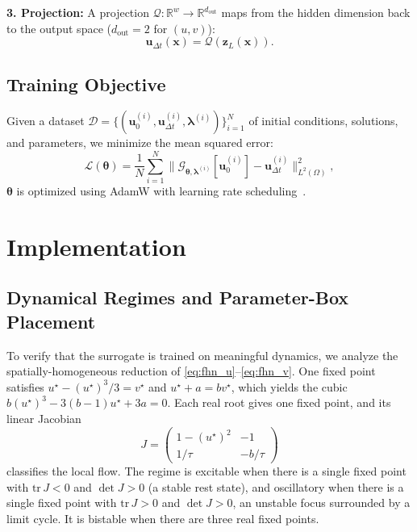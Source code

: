 \documentclass[runningheads]{llncs}
\begin{document}
\textbf{3. Projection:} A projection $\mathcal{Q}: \mathbb{R}^w \rightarrow \mathbb{R}^{d_{\text{out}}}$ maps from the hidden dimension back to the output space ($d_{\text{out}} = 2$ for $(u,v)$):
\begin{equation}
    \bm{u}_{\Delta t}(\bm{x}) = \mathcal{Q}(\bm{z}_L(\bm{x})).
\end{equation}

\subsection{Training Objective}
\label{sec:training}

Given a dataset $\mathcal{D} = \{(\bm{u}_0^{(i)}, \bm{u}_{\Delta t}^{(i)}, \bm{\lambda}^{(i)})\}_{i=1}^N$ of initial conditions, solutions, and parameters, we minimize the mean squared error:
\begin{equation}
    \mathcal{L}(\bm{\theta}) = \frac{1}{N} \sum_{i=1}^N \|\mathcal{G}_{\bm{\theta}, \bm{\lambda}^{(i)}}[\bm{u}_0^{(i)}] - \bm{u}_{\Delta t}^{(i)}\|_{L^2(\Omega)}^2,
    \label{eq:loss}
\end{equation}
$\bm{\theta}$ is optimized using AdamW with learning rate scheduling~\cite{loshchilov2019decoupled}.

\FloatBarrier
\section{Implementation}
\label{sec:implementation}

\subsection{Dynamical Regimes and Parameter-Box Placement}
\label{sec:bifurcation}

To verify that the surrogate is trained on meaningful dynamics, we analyze the spatially-homogeneous reduction of \eqref{eq:fhn_u}--\eqref{eq:fhn_v}. One fixed point satisfies $u^\star - (u^\star)^3/3 = v^\star$ and $u^\star + a = b v^\star$, which yields the cubic $b (u^\star)^3 - 3(b-1) u^\star + 3 a = 0$. Each real root gives one fixed point, and its linear Jacobian
\begin{equation}
J = \begin{pmatrix} 1 - (u^\star)^2 & -1 \\ 1/\tau & -b/\tau \end{pmatrix}
\end{equation}
classifies the local flow. The regime is excitable when there is a single fixed point with $\mathrm{tr}\,J < 0$ and $\det J > 0$ (a stable rest state), and oscillatory when there is a single fixed point with $\mathrm{tr}\,J > 0$ and $\det J > 0$, an unstable focus surrounded by a limit cycle. It is bistable when there are three real fixed points.
\end{document}
